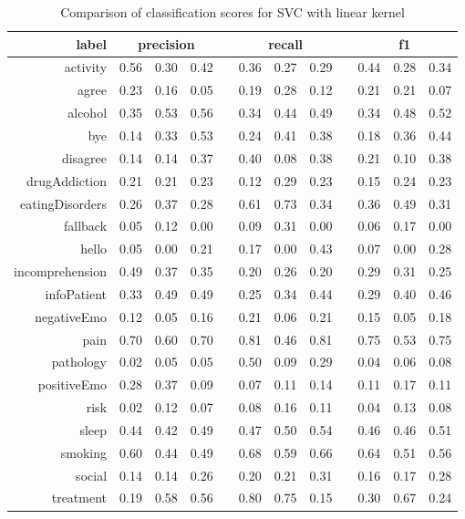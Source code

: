 \documentclass[11pt]{article}
\begin{document}
\begin{table}[htb]
\begin{center}
\begin{tabular}{ |r|c|c|c|l|c|c|c|l|c|c|c| }
\hline
label 			& \multicolumn{3}{c|}{precision} && \multicolumn{3}{c|}{recall} && \multicolumn{3}{c|}{f1} \\ \hline 
activity 		&  0.56 & 0.30 & 0.42 && 0.36 & 0.27 & 0.29 && 0.44 & 0.28 & 0.34 \\ \hline 
agree 			&  0.23 & 0.16 & 0.05 && 0.19 & 0.28 & 0.12 && 0.21 & 0.21 & 0.07 \\ \hline 
alcohol 		&  0.35 & 0.53 & 0.56 && 0.34 & 0.44 & 0.49 && 0.34 & 0.48 & 0.52 \\ \hline 
bye 			&  0.14 & 0.33 & 0.53 && 0.24 & 0.41 & 0.38 && 0.18 & 0.36 & 0.44 \\ \hline 
disagree 		&  0.14 & 0.14 & 0.37 && 0.40 & 0.08 & 0.38 && 0.21 & 0.10 & 0.38 \\ \hline 
drugAddiction 	&  0.21 & 0.21 & 0.23 && 0.12 & 0.29 & 0.23 && 0.15 & 0.24 & 0.23 \\ \hline 
eatingDisorders &  0.26 & 0.37 & 0.28 && 0.61 & 0.73 & 0.34 && 0.36 & 0.49 & 0.31 \\ \hline 
fallback 		&  0.05 & 0.12 & 0.00 && 0.09 & 0.31 & 0.00 && 0.06 & 0.17 & 0.00 \\ \hline 
hello 			&  0.05 & 0.00 & 0.21 && 0.17 & 0.00 & 0.43 && 0.07 & 0.00 & 0.28 \\ \hline 
incomprehension &  0.49 & 0.37 & 0.35 && 0.20 & 0.26 & 0.20 && 0.29 & 0.31 & 0.25 \\ \hline 
infoPatient 	&  0.33 & 0.49 & 0.49 && 0.25 & 0.34 & 0.44 && 0.29 & 0.40 & 0.46 \\ \hline 
negativeEmo 	&  0.12 & 0.05 & 0.16 && 0.21 & 0.06 & 0.21 && 0.15 & 0.05 & 0.18 \\ \hline 
pain 			&  0.70 & 0.60 & 0.70 && 0.81 & 0.46 & 0.81 && 0.75 & 0.53 & 0.75 \\ \hline 
pathology 		&  0.02 & 0.05 & 0.05 && 0.50 & 0.09 & 0.29 && 0.04 & 0.06 & 0.08 \\ \hline 
positiveEmo 	&  0.28 & 0.37 & 0.09 && 0.07 & 0.11 & 0.14 && 0.11 & 0.17 & 0.11 \\ \hline 
risk 			&  0.02 & 0.12 & 0.07 && 0.08 & 0.16 & 0.11 && 0.04 & 0.13 & 0.08 \\ \hline 
sleep 			&  0.44 & 0.42 & 0.49 && 0.47 & 0.50 & 0.54 && 0.46 & 0.46 & 0.51 \\ \hline 
smoking 		&  0.60 & 0.44 & 0.49 && 0.68 & 0.59 & 0.66 && 0.64 & 0.51 & 0.56 \\ \hline 
social 			&  0.14 & 0.14 & 0.26 && 0.20 & 0.21 & 0.31 && 0.16 & 0.17 & 0.28 \\ \hline 
treatment		&  0.19 & 0.58 & 0.56 && 0.80 & 0.75 & 0.15 && 0.30 & 0.67 & 0.24 \\ \hline 
\end{tabular}
\caption{Comparison of classification scores for SVC with linear kernel}
\end{center}
\end{table}
\FloatBarrier
\end{document}
